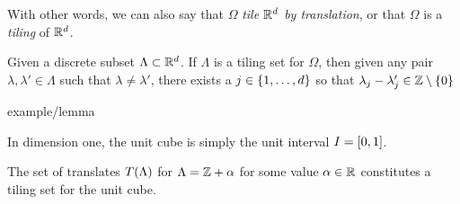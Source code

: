 \documentclass[../thesis.tex]{subfiles}
\begin{document}
With other words, we can also say that $\Omega$ \emph{tile $\mathbb{R}^d$ by translation}, or that $\Omega$ is a \emph{tiling} of $\mathbb{R}^d$. 





\begin{theorem}\label{thrm:keller_tiling}
    Given a discrete subset $\Lambda \subset \mathbb{R}^d$. If $\Lambda$ is a tiling set for $\Omega$, then given any pair $\lambda, \lambda' \in \Lambda$ such that $\lambda\neq\lambda'$, there exists a $j\in \{1,\dots,d\}$ so that $\lambda_j -\lambda_j' \in \mathbb{Z}\setminus\{0\}$
\end{theorem}


example/lemma

In dimension one, the unit cube is simply the unit interval $I=[0,1]$. 

\begin{lemma}\label{lem:tiling_unit_1d}
    The set of translates $T(\Lambda)$ for $\Lambda = \mathbb{Z} +\alpha$ for some value $\alpha\in \mathbb{R}$ constitutes a tiling set for the unit cube.
\end{lemma}
\end{document}
